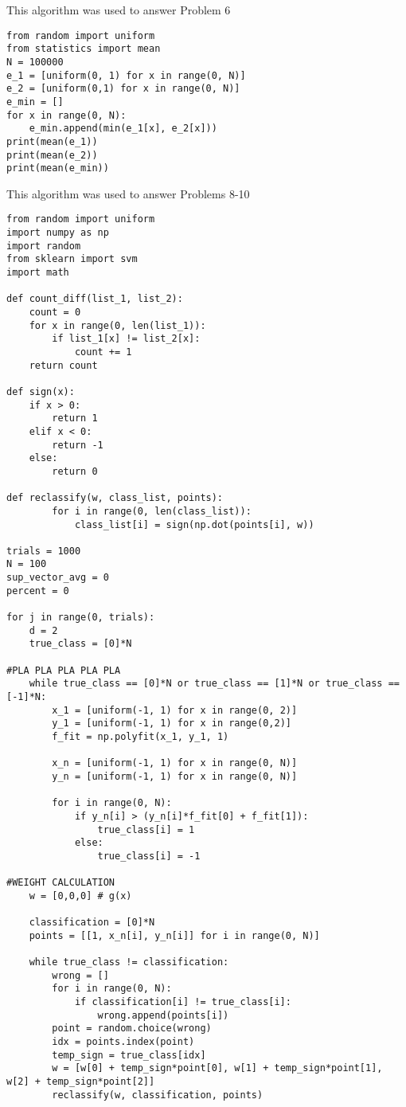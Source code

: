 \documentclass{article}
\begin{document}
\newpage
{\huge This algorithm was used to answer Problem 6}
\begin{verbatim}
from random import uniform
from statistics import mean
N = 100000
e_1 = [uniform(0, 1) for x in range(0, N)]
e_2 = [uniform(0,1) for x in range(0, N)]
e_min = []
for x in range(0, N):
    e_min.append(min(e_1[x], e_2[x]))
print(mean(e_1))
print(mean(e_2))
print(mean(e_min))
\end{verbatim}
\newpage
{\huge This algorithm was used to answer Problems 8-10}
\begin{verbatim}
from random import uniform
import numpy as np
import random
from sklearn import svm
import math

def count_diff(list_1, list_2):
    count = 0
    for x in range(0, len(list_1)):
        if list_1[x] != list_2[x]:
            count += 1
    return count 

def sign(x):
    if x > 0:
        return 1
    elif x < 0:
        return -1
    else:
        return 0
    
def reclassify(w, class_list, points):
        for i in range(0, len(class_list)):
            class_list[i] = sign(np.dot(points[i], w))

trials = 1000
N = 100
sup_vector_avg = 0
percent = 0

for j in range(0, trials):
    d = 2
    true_class = [0]*N

#PLA PLA PLA PLA PLA
    while true_class == [0]*N or true_class == [1]*N or true_class == [-1]*N:
        x_1 = [uniform(-1, 1) for x in range(0, 2)]
        y_1 = [uniform(-1, 1) for x in range(0,2)]
        f_fit = np.polyfit(x_1, y_1, 1)

        x_n = [uniform(-1, 1) for x in range(0, N)]
        y_n = [uniform(-1, 1) for x in range(0, N)]

        for i in range(0, N):
            if y_n[i] > (y_n[i]*f_fit[0] + f_fit[1]):
                true_class[i] = 1
            else:
                true_class[i] = -1

#WEIGHT CALCULATION
    w = [0,0,0] # g(x) 

    classification = [0]*N
    points = [[1, x_n[i], y_n[i]] for i in range(0, N)]

    while true_class != classification:
        wrong = []
        for i in range(0, N):
            if classification[i] != true_class[i]:
                wrong.append(points[i])
        point = random.choice(wrong)
        idx = points.index(point)
        temp_sign = true_class[idx]
        w = [w[0] + temp_sign*point[0], w[1] + temp_sign*point[1], w[2] + temp_sign*point[2]]
        reclassify(w, classification, points)


\end{verbatim}
\end{document}
